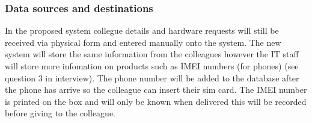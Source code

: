 \subsubsection{Data sources and destinations}

In the proposed system collegue details and hardware requests will still be received via physical form and entered manually onto the system. The new system will store the same information from the colleagues however the IT staff will store more infomation on products such as IMEI numbers (for phones) (see question 3 in interview). The phone number will be added to the database after the phone has arrive so the colleague can insert their sim card. The IMEI number is printed on the box and will only be known when delivered this will be recorded before giving to the colleague.

